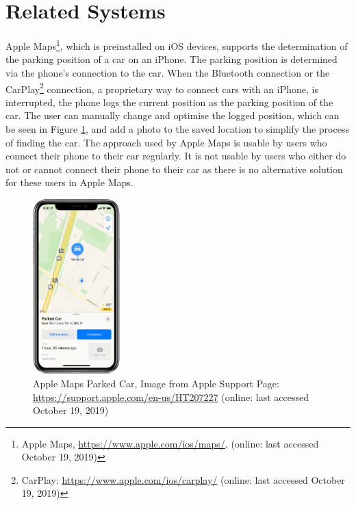 \section{Related Systems}

Apple Maps\footnote{Apple Maps, \url{https://www.apple.com/ios/maps/}, (online: last accessed October 19, 2019)}, which is preinstalled on iOS devices, supports the determination of the parking position of a car on an iPhone. The parking position is determined via the phone's connection to the car. When the Bluetooth connection or the CarPlay\footnote{CarPlay: \url{https://www.apple.com/ios/carplay/} (online: last accessed October 19, 2019)} connection, a proprietary way to connect cars with an iPhone, is interrupted, the phone logs the current position as the parking position of the car. The user can manually change and optimise the logged position, which can be seen in Figure \ref{fig:ios_park_det}, and add a photo to the saved location to simplify the process of finding the car. The approach used by Apple Maps is usable by users who connect their phone to their car regularly. It is not usable by users who either do not or cannot connect their phone to their car as there is no alternative solution for these users in Apple Maps. \cite{apple:maps:parkedcar}

\begin{figure}[h]
  \centering
  \includegraphics[width=0.3\textwidth]{images/ios13-iphone-xs-maps-parked-car.png}
  \caption{Apple Maps Parked Car, Image from Apple Support Page: \url{https://support.apple.com/en-us/HT207227} (online: last accessed October 19, 2019)}
  \label{fig:ios_park_det}
\end{figure}

